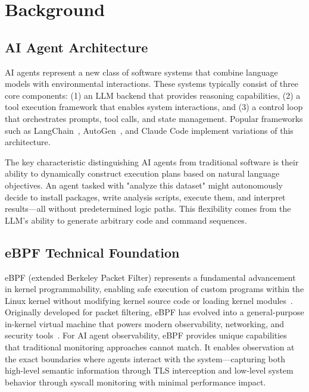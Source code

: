 \section{Background}

\subsection{AI Agent Architecture}

AI agents represent a new class of software systems that combine language models with environmental interactions. These systems typically consist of three core components: (1) an LLM backend that provides reasoning capabilities, (2) a tool execution framework that enables system interactions, and (3) a control loop that orchestrates prompts, tool calls, and state management. Popular frameworks such as LangChain~\cite{langchain}, AutoGen~\cite{autogen}, and Claude Code implement variations of this architecture.

The key characteristic distinguishing AI agents from traditional software is their ability to dynamically construct execution plans based on natural language objectives. An agent tasked with "analyze this dataset" might autonomously decide to install packages, write analysis scripts, execute them, and interpret results—all without predetermined logic paths. This flexibility comes from the LLM's ability to generate arbitrary code and command sequences.

\subsection{eBPF Technical Foundation}

eBPF (extended Berkeley Packet Filter) represents a fundamental advancement in kernel programmability, enabling safe execution of custom programs within the Linux kernel without modifying kernel source code or loading kernel modules~\cite{brendangregg}. Originally developed for packet filtering, eBPF has evolved into a general-purpose in-kernel virtual machine that powers modern observability, networking, and security tools~\cite{ebpfio,cilium}. For AI agent observability, eBPF provides unique capabilities that traditional monitoring approaches cannot match. It enables observation at the exact boundaries where agents interact with the system—capturing both high-level semantic information through TLS interception and low-level system behavior through syscall monitoring with minimal performance impact.

